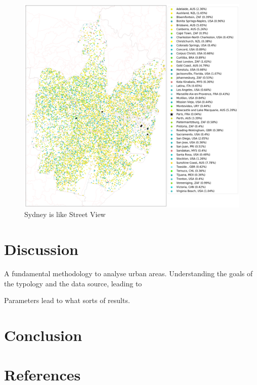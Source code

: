 \documentclass[sageh,times]{sagej}
\begin{document}
\begin{figure}[!htbp]
\includegraphics[scale=0.25]{Images/SydneyOverallAbrev_street.png}  
\caption{Sydney is like Street View}    
 \label{fig:sydmaps}  
\end{figure} 




\section{Discussion}\label{sec:discussion}

A fundamental methodology to analyse urban areas. Understanding the goals of the typology and the data source, leading to 

Parameters lead to what sorts of results.

\section{Conclusion}\label{sec:conclusion}


\section*{References}\label{sec:ref}
\end{document}
